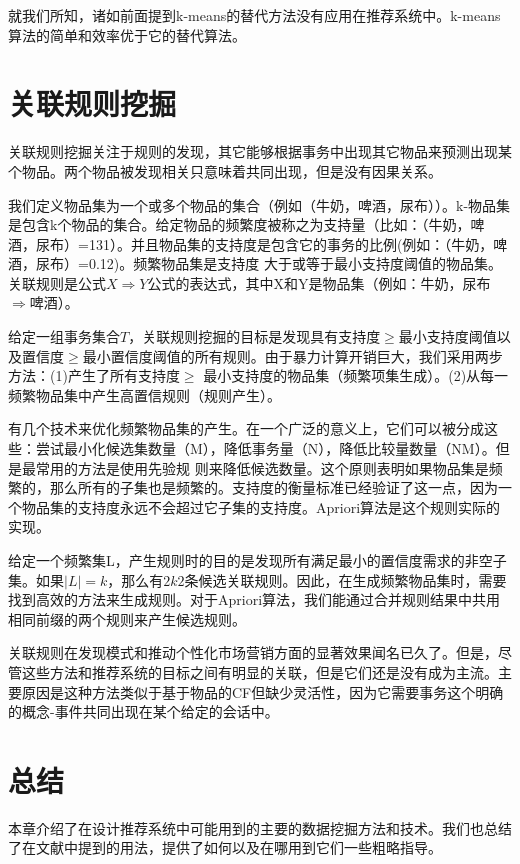\documentclass{article}
\begin{document}
就我们所知，诸如前面提到k-means的替代方法没有应用在推荐系统中。k-means算法的简单和效率优于它的替代算法。

\section{关联规则挖掘}
关联规则挖掘关注于规则的发现，其它能够根据事务中出现其它物品来预测出现某个物品。两个物品被发现相关只意味着共同出现，但是没有因果关系。

我们定义物品集为一个或多个物品的集合（例如（牛奶，啤酒，尿布））。k-物品集是包含k个物品的集合。给定物品的频繁度被称之为支持量（比如：（牛奶，啤酒，尿布）=131）。并且物品集的支持度是包含它的事务的比例(例如：（牛奶，啤酒，尿布）=0.12)。频繁物品集是支持度
大于或等于最小支持度阈值的物品集。关联规则是公式$X\Rightarrow Y$公式的表达式，其中X和Y是物品集（例如：牛奶，尿布$\Rightarrow$啤酒）。

给定一组事务集合$T$，关联规则挖掘的目标是发现具有支持度$\geq$最小支持度阈值以及置信度$\geq$最小置信度阈值的所有规则。由于暴力计算开销巨大，我们采用两步方法：(1)产生了所有支持度$\geq$ 最小支持度的物品集（频繁项集生成）。(2)从每一频繁物品集中产生高置信规则（规则产生）。

有几个技术来优化频繁物品集的产生。在一个广泛的意义上，它们可以被分成这些：尝试最小化候选集数量（M），降低事务量（N），降低比较量数量（NM）。但是最常用的方法是使用先验规
则来降低候选数量。这个原则表明如果物品集是频繁的，那么所有的子集也是频繁的。支持度的衡量标准已经验证了这一点，因为一个物品集的支持度永远不会超过它子集的支持度。Apriori算法是这个规则实际的实现。

给定一个频繁集L，产生规则时的目的是发现所有满足最小的置信度需求的非空子集。如果$|L|=k$，那么有$2k2$条候选关联规则。因此，在生成频繁物品集时，需要找到高效的方法来生成规则。对于Apriori算法，我们能通过合并规则结果中共用相同前缀的两个规则来产生候选规则。

关联规则在发现模式和推动个性化市场营销方面的显著效果闻名已久了。但是，尽管这些方法和推荐系统的目标之间有明显的关联，但是它们还是没有成为主流。主要原因是这种方法类似于基于物品的CF但缺少灵活性，因为它需要事务这个明确的概念\--事件共同出现在某个给定的会话中。

\section{总结}
本章介绍了在设计推荐系统中可能用到的主要的数据挖掘方法和技术。我们也总结了在文献中提到的用法，提供了如何以及在哪用到它们一些粗略指导。
\end{document}
